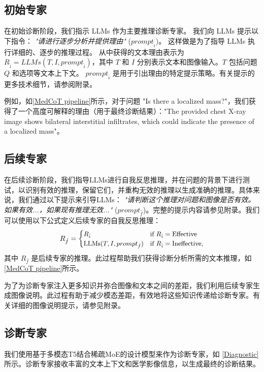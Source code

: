 \documentclass[11pt]{article}
\begin{document}
\subsection{初始专家}
在初始诊断阶段，我们指示 LLMs 作为主要推理诊断专家。
我们向 LLMs 提示以下指令：
\textit{"请进行逐步分析并提供理由"} ($prompt_{\hat{i}}$)。
这样做是为了指导 LLMs 执行详细的、逐步的推理过程。
从中获得的文本理由表示为 \( R_{\hat{i}} = LLMs(T, I, prompt_{\hat{i}}) \)，其中 \( T \) 和 \( I \) 分别表示文本和图像输入。\( T \) 包括问题 \( Q \) 和选项等文本上下文。
\( prompt_{\hat{i}} \) 是用于引出理由的特定提示策略。有关提示的更多技术细节，请参阅附录。

例如，如\autoref{MedCoT pipeline}所示，对于问题 "Is there a localized mass?"，我们获得了一个高度可解释的理由（用于最终诊断结果）："The provided chest X-ray image shows bilateral interstitial infiltrates, which could indicate the presence of a localized mass"。
\subsection{后续专家}
在后续诊断阶段，我们指导LLMs进行自我反思推理，并在问题的背景下进行测试，以识别有效的推理，保留它们，并重构无效的推理以生成准确的推理。具体来说，我们通过以下提示来引导LLMs：
\textit{"请判断这个推理对问题和图像是否有效。如果有效...，如果现有推理无效..."} ($prompt_{\hat{f}}$)。完整的提示内容请参见附录。我们可以使用以下公式定义后续专家的自我反思推理：
\begin{equation}
\begin{small}
R_{\hat{f}} =
\begin{cases}
R_{\hat{i}} & \text{if } R_{\hat{i}} = \text{Effective} \\
\text{LLMs}(T, I, {prompt}_{\hat{f}}) & \text{if } R_{\hat{i}} = \text{Ineffective},
\end{cases}
\end{small}
\end{equation}
其中 $R_{\hat{f}}$ 是后续专家的推理。此过程帮助我们获得诊断分析所需的文本推理，如\autoref{MedCoT pipeline}所示。

为了为诊断专家注入更多知识并弥合图像和文本之间的差距，我们利用后续专家生成图像说明。此过程有助于减少模态差距，有效地将这些知识传递给诊断专家。有关详细的图像说明提示，请参见附录。
\subsection{诊断专家}
我们使用基于多模态T5结合稀疏MoE的设计模型来作为诊断专家，如 \autoref{Diagnostic} 所示。诊断专家接收丰富的文本上下文和医学影像信息，以生成最终的诊断结果。
\end{document}
